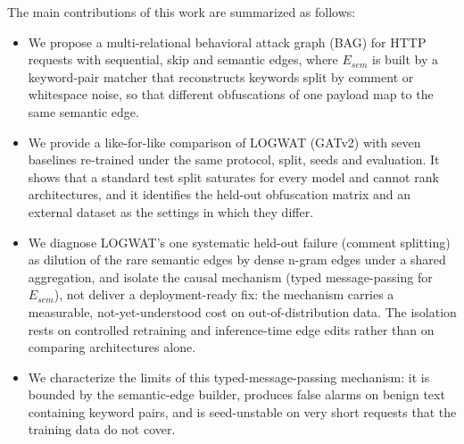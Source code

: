 The main contributions of this work are summarized as follows:
\begin{itemize}
    \item We propose a multi-relational behavioral attack graph (BAG) for HTTP requests with sequential, skip and semantic edges, where $E_{sem}$ is built by a keyword-pair matcher that reconstructs keywords split by comment or whitespace noise, so that different obfuscations of one payload map to the same semantic edge.
    \item We provide a like-for-like comparison of LOGWAT (GATv2) with seven baselines re-trained under the same protocol, split, seeds and evaluation. It shows that a standard test split saturates for every model and cannot rank architectures, and it identifies the held-out obfuscation matrix and an external dataset as the settings in which they differ.
    \item We diagnose LOGWAT's one systematic held-out failure (comment splitting) as dilution of the rare semantic edges by dense n-gram edges under a shared aggregation, and isolate the causal mechanism (typed message-passing for $E_{sem}$), not deliver a deployment-ready fix: the mechanism carries a measurable, not-yet-understood cost on out-of-distribution data. The isolation rests on controlled retraining and inference-time edge edits rather than on comparing architectures alone.
    \item We characterize the limits of this typed-message-passing mechanism: it is bounded by the semantic-edge builder, produces false alarms on benign text containing keyword pairs, and is seed-unstable on very short requests that the training data do not cover.
\end{itemize}

